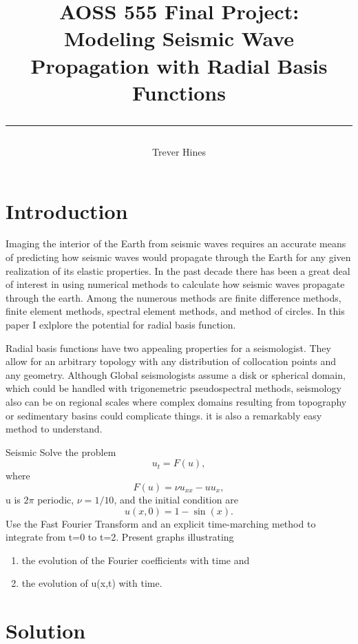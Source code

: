 \documentclass[12pt]{article}
\title{	
AOSS 555 Final Project:\\
Modeling Seismic Wave Propagation with Radial Basis Functions\\
\author{Trever Hines}
\rule{\headwidth}{1.0pt}
}
\begin{document}
\maketitle
\section*{Introduction}
  Imaging the interior of the Earth from seismic waves requires an
  accurate means of predicting how seismic waves would propagate
  through the Earth for any given realization of its elastic
  properties.  In the past decade there has been a great deal of
  interest in using numerical methods to calculate how seismic waves
  propagate through the earth.  Among the numerous methods are finite
  difference methods, finite element methods, spectral element
  methods, and method of circles.  In this paper I exlplore the
  potential for radial basis function.

  Radial basis functions have two appealing properties for a
  seismologist.  They allow for an arbitrary topology with any
  distribution of collocation points and any geometry. Although Global
  seismologists assume a disk or spherical domain, which could be
  handled with trigonemetric pseudospectral methods, seismology also
  can be on regional scales where complex domains resulting from
  topography or sedimentary basins could complicate things. it is also
  a remarkably easy method to understand.


Seismic 
Solve the problem
\begin{equation}\label{Problem}
  u_t = F(u),
\end{equation}
where
\begin{equation}\label{F}
  F(u) = \nu u_{xx} - uu_x,
\end{equation}
u is $2\pi$ periodic, $\nu=1/10$, and the initial condition are
\begin{equation}\label{IC}
  u(x,0) = 1 - \sin(x).
\end{equation}
Use the Fast Fourier Transform and an explicit time-marching method to
integrate from t=0 to t=2.  Present graphs illustrating
\begin{enumerate}
\item the evolution of the Fourier coefficients with time and
\item the evolution of u(x,t) with time.
\end{enumerate}

\section*{Solution}
\end{document}
